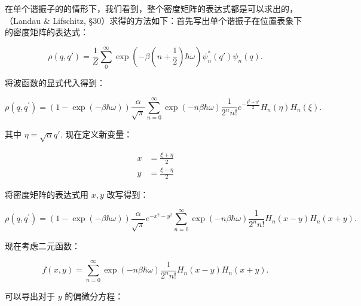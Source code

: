 在单个谐振子的的情形下，我们看到，整个密度矩阵的表达式都是可以求出的，（Landau \& Lifschitz, \S 30）求得的方法如下：首先写出单个谐振子在位置表象下的密度矩阵的表达式：
\begin{linenomath}\begin{equation}
    \rho\left( q,q' \right) = \frac{1}{Z}\sum_{0}^{\infty} \exp\left(-\beta \left( n+\frac{1}{2} \right) \hbar \omega \right) \psi_n^*(q')\psi_n(q).
\end{equation}\end{linenomath}
将波函数的显式代入得到：
\begin{linenomath}
    \begin{equation}
        \rho\left( q,q^{\prime} \right)=(1-\exp(-\beta\hbar \omega))\frac{\alpha}{\sqrt{\pi}} \sum_{n=0}^\infty \exp\left( -n\beta\hbar\omega \right)\frac{1}{2^n n!} e^{-\frac{\xi^2+\eta^2}{2}} H_n\left( \eta \right) H_n\left( \xi \right).
    \end{equation}
\end{linenomath}
其中 $\eta = \sqrt{\alpha} q'$. 现在定义新变量：
\begin{linenomath}
    \begin{equation}
        \begin{aligned}
            x &= \frac{\xi + \eta}{2} \\
            y &= \frac{\xi - \eta}{2}
        \end{aligned}
    \end{equation}
\end{linenomath}将密度矩阵的表达式用 $x,y$ 改写得到：
\begin{linenomath}
    \begin{equation}
        \rho\left( q,q^{\prime} \right) = (1-\exp(-\beta\hbar \omega))\frac{\alpha}{\sqrt{\pi}} e^{-x^2-y^2} \sum_{n=0}^\infty \exp\left( -n\beta\hbar\omega \right)\frac{1}{2^n n!} H_n\left( x-y \right) H_n\left( x+y \right).
    \end{equation}
\end{linenomath}
现在考虑二元函数：
\begin{linenomath}
    \begin{equation}
        f(x,y) = \sum_{n=0}^\infty \exp\left( -n\beta\hbar\omega \right)\frac{1}{2^n n!} H_n\left( x-y \right) H_n\left( x+y \right).
    \end{equation}
\end{linenomath}
可以导出对于 $y$ 的偏微分方程：
